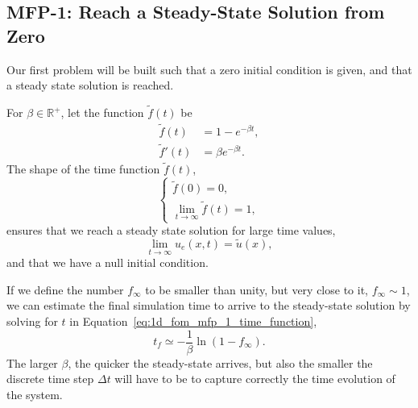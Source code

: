 \documentclass[../../main.tex]{subfiles}
\begin{document}

\subsection{MFP-1: Reach a Steady-State Solution from Zero}
Our first problem will be built such that a zero initial condition is given, and that a steady state solution is reached. 

For $\beta \in \mathbb{R}^{+}$, let the function $\tilde{f}(t)$ be
\begin{subequations}
    \begin{align}
        \tilde{f}(t) &= 1 - e^{-\beta t}, \label{eq:1d_fom_mfp_1_time_function}\\
        \tilde{f}'(t) &= \beta e^{-\beta t}.
    \end{align}
\end{subequations}
The shape of the time function $\tilde{f}(t)$,
\begin{equation*}
    \begin{cases}
    \tilde{f}(0) = 0, \\ 
    \lim_{t \rightarrow \infty} \tilde{f}(t) = 1,
    \end{cases}
\end{equation*}
ensures that we reach a steady state solution for large time values,
\begin{equation}
    \lim_{t\rightarrow \infty} u_e(x,t) = \tilde{u}(x),
\end{equation}
and that we have a null initial condition.

If we define the number $f_\infty$ to be smaller than unity, but very close to it, $f_\infty \sim 1$, we can estimate the final simulation time to arrive to the steady-state solution by solving for $t$ in Equation~\eqref{eq:1d_fom_mfp_1_time_function},
\begin{equation}
    t_f \simeq - \frac{1}{\beta} \ln(1 - f_\infty).
\end{equation}
The larger $\beta$, the quicker the steady-state arrives, but also the smaller the discrete time step $\Delta t$ will have to be to capture correctly the time evolution of the system.
\end{document}
